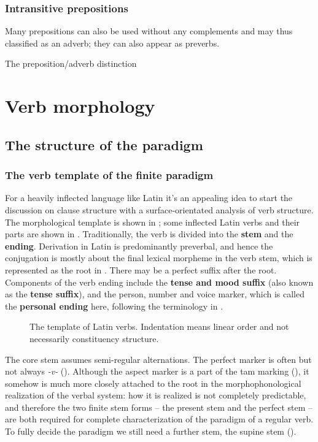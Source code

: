 \documentclass[a4paper, oneside, 12pt]{report}
\newcommand*{\citesec}[1]{\S~{#1}}
\newcommand*{\concept}[1]{\textbf{#1}}
\newcommand{\form}[1]{\emph{#1}}
\begin{document}
\subsection{Intransitive prepositions}

Many prepositions can also be used without any complements 
and may thus classified as an adverb; 
they can also appear as preverbs.

The preposition/adverb distinction

\chapter{Verb morphology}\label{chap:verb}

\section{The structure of the paradigm}

\subsection{The verb template of the finite paradigm}\label{sec:verb.finite.paradigm}

For a heavily inflected language like Latin
it's an appealing idea 
to start the discussion on clause structure 
with a surface-orientated analysis of verb structure.
The morphological template is shown in ; 
some inflected Latin verbs and their parts are shown in .
Traditionally, the verb is divided 
into the \concept{stem} and the \concept{ending}.
Derivation in Latin is predominantly preverbal,
and hence the conjugation is mostly about the final lexical morpheme in the verb stem,
which is represented as the root in .
There may be a perfect suffix after the root.
Components of the verb ending include 
the \concept{tense and mood suffix} (also known as the \concept{tense suffix}),
and the person, number and voice marker,
which is called the \concept{personal ending} here, 
following the terminology in \citet[\citesec{165}]{allen1903allen}.

\begin{figure}[H]
    \centering
    
    \caption{The template of Latin verbs.
    Indentation means linear order and not necessarily constituency structure.}
    \label{fig:latin-verb}
\end{figure}

The core stem assumes semi-regular alternations.
The perfect marker is often but not always \form{-v-} ().
Although the aspect marker is a part of the \acs{tam} marking
(),
it somehow is much more closely attached to the root 
in the morphophonological realization of the verbal system:
how it is realized is not completely predictable,
and therefore the two finite stem forms -- 
the present stem and the perfect stem -- 
are both required for complete characterization of the paradigm of a regular verb.
To fully decide the paradigm 
we still need a further stem, the supine stem
().
\end{document}
